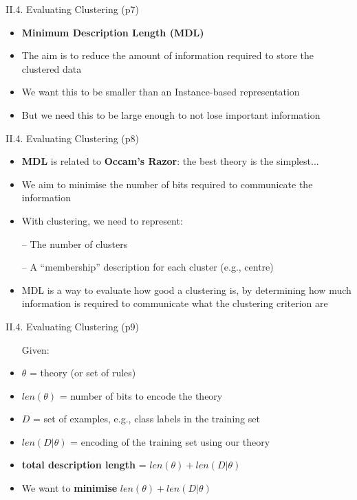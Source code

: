 \documentclass[handout]{beamer}
\newcommand{\strong}[1]{\textbf{\color{teal} #1}}
\newcommand{\stronger}[1]{\textbf{\color{purple} #1}}
\begin{document}
\begin{frame}{II.4. Evaluating Clustering (p7)}
\begin{itemize}
\item \stronger{Minimum Description Length (MDL)}
\item The aim is to reduce the amount of information required to store the clustered data
\item We want this to be smaller than an Instance-based representation
\item But we need this to be large enough to not lose important information
\end{itemize}
\end{frame}
\begin{frame}{II.4. Evaluating Clustering (p8)}
\begin{itemize}
\item \stronger{MDL} is related to \strong{Occam's Razor}: the best theory is the simplest...
\item We aim to minimise the number of bits required to communicate the information
\item With clustering, we need to represent:
\item[--] The number of clusters
\item[--] A ``membership'' description for each cluster (e.g., centre)
\item MDL is a way to evaluate how good a clustering is, by determining how much information is required to communicate what the clustering criterion are
\end{itemize}
\end{frame}
\begin{frame}{II.4. Evaluating Clustering (p9)}
\begin{itemize}
\item[] Given:
\item $\theta$ = theory (or set of rules)
\item $len(\theta)$ = number of bits to encode the theory
\item $D$ = set of examples, e.g., class labels in the training set
\item $len(D|\theta)$ = encoding of the training set using our theory
\item[]
\item \strong{total description length} = $len(\theta) + len(D|\theta)$
\item[]
\item We want to \strong{minimise} $len(\theta) + len(D|\theta)$
\end{itemize}
\end{frame}
\end{document}

